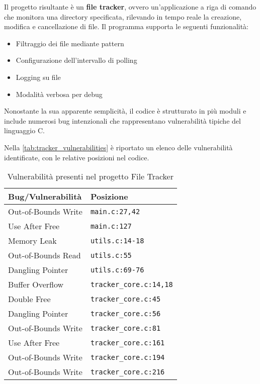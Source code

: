 Il progetto risultante è un \textbf{file tracker}, ovvero un'applicazione a riga
di comando che monitora una directory specificata, rilevando in tempo reale la
creazione, modifica e cancellazione di file. Il programma supporta le seguenti
funzionalità:
\begin{itemize}
  \item Filtraggio dei file mediante pattern

  \item Configurazione dell'intervallo di polling

  \item Logging su file

  \item Modalità verbosa per debug
\end{itemize}

Nonostante la sua apparente semplicità, il codice è strutturato in più moduli e include
numerosi bug intenzionali che rappresentano vulnerabilità tipiche del linguaggio
C.

Nella \autoref{tab:tracker_vulnerabilities} è riportato un elenco delle vulnerabilità
identificate, con le relative posizioni nel codice.

\begin{table}[htbp]
  \centering
  \small
  \begin{tabular}{|l|l|}
    \hline
    \textbf{Bug/Vulnerabilità} & \textbf{Posizione}             \\
    \hline
    Out-of-Bounds Write        & \texttt{main.c:27,42}          \\
    \hline
    Use After Free             & \texttt{main.c:127}            \\
    \hline
    Memory Leak                & \texttt{utils.c:14-18}         \\
    \hline
    Out-of-Bounds Read         & \texttt{utils.c:55}            \\
    \hline
    Dangling Pointer           & \texttt{utils.c:69-76}         \\
    \hline
    Buffer Overflow            & \texttt{tracker\_core.c:14,18} \\
    \hline
    Double Free                & \texttt{tracker\_core.c:45}    \\
    \hline
    Dangling Pointer           & \texttt{tracker\_core.c:56}    \\
    \hline
    Out-of-Bounds Write        & \texttt{tracker\_core.c:81}    \\
    \hline
    Use After Free             & \texttt{tracker\_core.c:161}   \\
    \hline
    Out-of-Bounds Write        & \texttt{tracker\_core.c:194}   \\
    \hline
    Out-of-Bounds Write        & \texttt{tracker\_core.c:216}   \\
    \hline
  \end{tabular}
  \caption{Vulnerabilità presenti nel progetto File Tracker}
  \label{tab:tracker_vulnerabilities}
\end{table}

